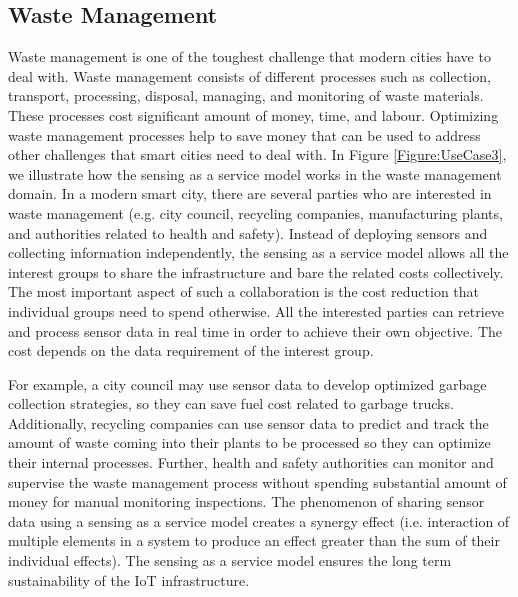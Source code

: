 \documentclass[times]{ettauth}
\begin{document}
\subsection{Waste Management}
\label{sec:Action:Waste_Management}

Waste management is one of the toughest challenge that modern cities have to deal with. Waste management consists of different processes such as  collection, transport, processing, disposal, managing, and monitoring of waste materials. These processes cost significant amount of money, time, and labour. Optimizing waste management processes help to save money that can be used to address other challenges that smart cities need to deal with. In Figure \ref{Figure:UseCase3}, we illustrate how the sensing as a service model works in the waste management domain. In a modern smart city, there are several parties who are interested in waste management (e.g. city council, recycling companies, manufacturing plants, and authorities related to health and safety). Instead of deploying sensors and collecting information independently, the sensing as a service model allows all the interest groups to share the infrastructure and bare the related costs collectively. The most important aspect of such a collaboration is the cost reduction that individual groups need to spend otherwise. All the interested parties can retrieve and process sensor data in real time in order to achieve their own objective. The cost depends on the data requirement of the interest group. 


For example, a city council may use sensor data to develop optimized garbage collection strategies, so they can save fuel cost related to garbage trucks. Additionally, recycling companies can use sensor data to predict and track the amount of  waste coming into their plants to be processed so they can optimize their internal processes. Further, health and safety authorities can monitor and supervise the waste management process without spending substantial amount of money for manual monitoring inspections. The phenomenon of sharing sensor data using a sensing as a service model creates a synergy effect (i.e. interaction of multiple elements in a system to produce an effect greater than the sum of their individual effects). The sensing as a service model ensures the long term sustainability of the IoT infrastructure.
\end{document}
